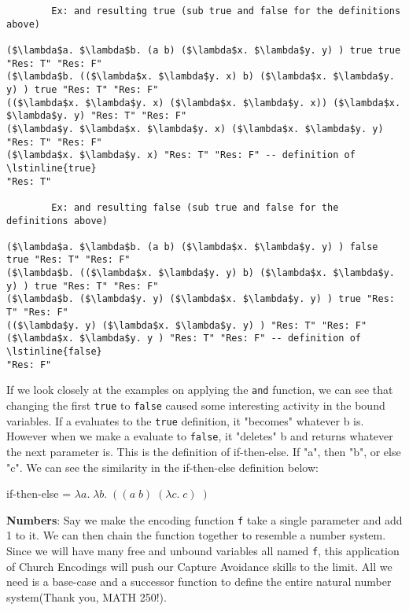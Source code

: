 \documentclass{article}
\begin{document}
        \begin{lstlisting}
        Ex: and resulting true (sub true and false for the definitions above)
        
($\lambda$a. $\lambda$b. (a b) ($\lambda$x. $\lambda$y. y) ) true true "Res: T" "Res: F"
($\lambda$b. (($\lambda$x. $\lambda$y. x) b) ($\lambda$x. $\lambda$y. y) ) true "Res: T" "Res: F"
(($\lambda$x. $\lambda$y. x) ($\lambda$x. $\lambda$y. x)) ($\lambda$x. $\lambda$y. y) "Res: T" "Res: F"
($\lambda$y. $\lambda$x. $\lambda$y. x) ($\lambda$x. $\lambda$y. y) "Res: T" "Res: F"
($\lambda$x. $\lambda$y. x) "Res: T" "Res: F" -- definition of \lstinline{true}
"Res: T"

        Ex: and resulting false (sub true and false for the definitions above)
        
($\lambda$a. $\lambda$b. (a b) ($\lambda$x. $\lambda$y. y) ) false true "Res: T" "Res: F"
($\lambda$b. (($\lambda$x. $\lambda$y. y) b) ($\lambda$x. $\lambda$y. y) ) true "Res: T" "Res: F"
($\lambda$b. ($\lambda$y. y) ($\lambda$x. $\lambda$y. y) ) true "Res: T" "Res: F"
(($\lambda$y. y) ($\lambda$x. $\lambda$y. y) ) "Res: T" "Res: F"
($\lambda$x. $\lambda$y. y ) "Res: T" "Res: F" -- definition of \lstinline{false}
"Res: F"

        \end{lstlisting}
        
        \medskip\noindent
        If we look closely at the examples on applying the \lstinline{and} function, we can see that changing the first \lstinline{true} to \lstinline{false} caused some interesting activity in the bound variables. If a evaluates to the \lstinline{true} definition, it "becomes" whatever b is. However when we make a evaluate to \lstinline{false}, it "deletes" b and returns whatever the next parameter is. This is the definition of if-then-else. If "a", then "b", or else "c". We can see the similarity in the if-then-else definition below:
        
        \medskip
        if-then-else = $\lambda a. \; \lambda b. \; ((a \; b) \; (\lambda c. \; c) \; )$
        
        \bigskip\noindent
        \textbf{Numbers}: Say we make the encoding function \lstinline{f} take a single parameter and add 1 to it. We can then chain the function together to resemble a number system. Since we will have many free and unbound variables all named \lstinline{f}, this application of Church Encodings will push our Capture Avoidance skills to the limit. All we need is a base-case and a successor function to define the entire natural number system(Thank you, MATH 250!).
        
\end{document}
